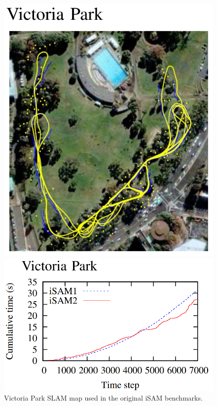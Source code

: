 \\ \\
\begin{figure}[H]
  \centering
  \begin{minipage}[t]{0.35\linewidth}
    \centering
    \includegraphics[width=\linewidth]{Pictures/Optimizers/iSAM2/Victoria_park_map.png}
    \caption*{\small Victoria Park SLAM map used in the original iSAM benchmarks.}
  \end{minipage}\hfill
  \begin{minipage}[t]{0.55\linewidth}
    \centering
    \includegraphics[width=\linewidth]{Pictures/Optimizers/iSAM2/Victoria_park_graph.png}

\end{minipage}
\end{figure}
